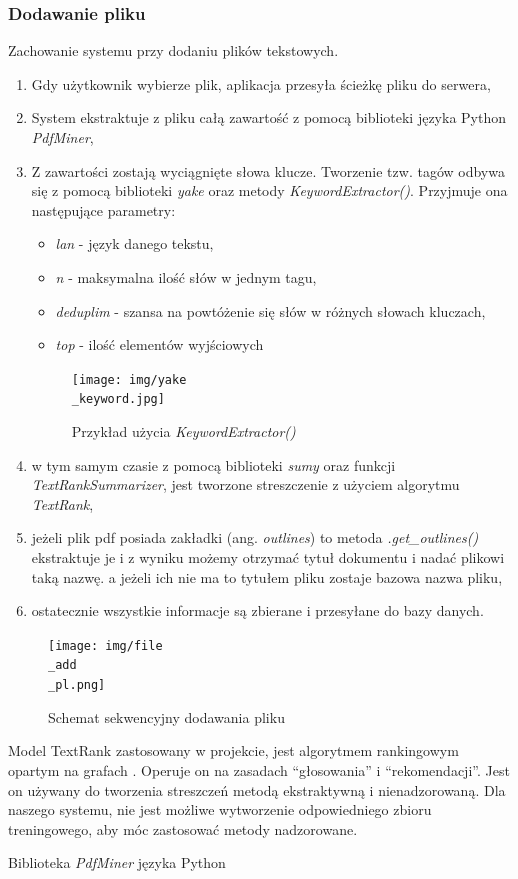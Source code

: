 \documentclass[12pt,a4paper,twoside]{article}
\begin{document}
\subsubsection{Dodawanie pliku}
Zachowanie systemu przy dodaniu plików tekstowych.
\begin{enumerate}
	\item Gdy użytkownik wybierze plik, aplikacja przesyła ścieżkę pliku do serwera,
	\item System ekstraktuje z pliku całą zawartość z pomocą biblioteki języka Python \textit{PdfMiner},
	\item Z zawartości zostają wyciągnięte słowa klucze. Tworzenie tzw. tagów odbywa się z pomocą biblioteki \textit{yake} oraz metody \textit{KeywordExtractor()}. Przyjmuje ona następujące parametry:
	\begin{itemize}
		\item \textit{lan} - język danego tekstu,
		\item \textit{n} - maksymalna ilość słów w jednym tagu,
		\item \textit{deduplim} - szansa na powtóżenie się słów w różnych słowach kluczach,
		\item \textit{top} - ilość elementów wyjściowych
	\end{itemize}
	\begin{figure}[h]
		\centering
  		\texttt{[image: img/yake\\\_keyword.jpg]}
  		\caption{Przykład użycia \textit{KeywordExtractor()}}
	\end{figure}
	\item w tym samym czasie z pomocą biblioteki \textit{sumy} oraz funkcji \textit{TextRankSummarizer}, jest tworzone streszczenie z użyciem algorytmu \textit{TextRank},
	\item jeżeli plik pdf posiada zakładki (ang. \textit{outlines}) to metoda \textit{.get\_outlines()} ekstraktuje je i z wyniku możemy otrzymać tytuł dokumentu i nadać plikowi taką nazwę. a jeżeli ich nie ma to tytułem pliku zostaje bazowa nazwa pliku,
	\item ostatecznie wszystkie informacje są zbierane i przesyłane do bazy danych.
\end{enumerate}
\begin{figure}[h]
\centering
  \texttt{[image: img/file\\\_add\\\_pl.png]}
  \caption{Schemat sekwencyjny dodawania pliku}
\end{figure}\par
Model TextRank zastosowany w projekcie, jest algorytmem rankingowym opartym na grafach \cite{textrank}. Operuje on na zasadach ``głosowania'' i ``rekomendacji''. Jest on używany do tworzenia streszczeń metodą ekstraktywną i nienadzorowaną. Dla naszego systemu, nie jest możliwe wytworzenie odpowiedniego zbioru treningowego, aby móc zastosować metody nadzorowane. \par
Biblioteka \textit{PdfMiner} języka Python
\newpage
\end{document}
